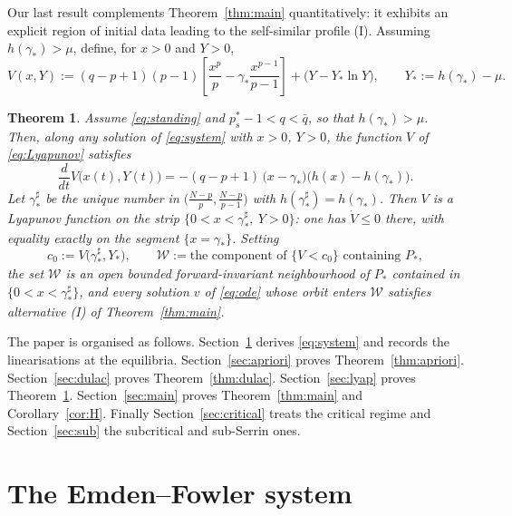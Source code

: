 \documentclass[11pt,reqno]{amsart}
\numberwithin{equation}{section}
\theoremstyle{plain}
\newtheorem{theorem}{Theorem}[section]
\theoremstyle{definition}
\newcommand{\gs}{\gamma_{*}}
\begin{document}
Our last result complements Theorem~\ref{thm:main} quantitatively: it exhibits
an explicit region of initial data leading to the self-similar profile
{\rm(I)}. Assuming $h(\gs)>\mu$, define, for $x>0$ and $Y>0$,
\begin{equation}\label{eq:Lyapunov}
V(x,Y):=(q-p+1)(p-1)\left[\frac{x^{p}}{p}-\gs\frac{x^{p-1}}{p-1}\right]
+\big(Y-Y_{*}\ln Y\big),
\qquad Y_{*}:=h(\gs)-\mu .
\end{equation}

\begin{theorem}\label{thm:lyap}
Assume \eqref{eq:standing} and $p^{*}_{s}-1<q<\bar q$, so that
$h(\gs)>\mu$. Then, along any solution of \eqref{eq:system} with $x>0$,
$Y>0$, the function $V$ of \eqref{eq:Lyapunov} satisfies
\begin{equation}\label{eq:Vdot}
\frac{d}{dt}V\big(x(t),Y(t)\big)
=-(q-p+1)\,\big(x-\gs\big)\big(h(x)-h(\gs)\big).
\end{equation}
Let $\gs^{\sharp}$ be the unique number in $\big(\frac{N-p}{p},
\frac{N-p}{p-1}\big)$ with $h(\gs^{\sharp})=h(\gs)$. Then $V$ is a Lyapunov
function on the strip $\{0<x<\gs^{\sharp},\ Y>0\}$: one has $\dot V\le0$
there, with equality exactly on the segment $\{x=\gs\}$. Setting
\begin{equation}\label{eq:basin}
c_{0}:=V\big(\gs^{\sharp},Y_{*}\big),
\qquad
\mathcal W:=\text{the component of }\big\{V<c_{0}\big\}\text{ containing }P_{*},
\end{equation}
the set $\mathcal W$ is an open bounded forward-invariant neighbourhood of
$P_{*}$ contained in $\{0<x<\gs^{\sharp}\}$, and every solution $v$ of
\eqref{eq:ode} whose orbit enters $\mathcal W$ satisfies alternative {\rm(I)}
of Theorem~\ref{thm:main}.
\end{theorem}

The paper is organised as follows. Section~\ref{sec:system} derives
\eqref{eq:system} and records the linearisations at the equilibria.
Section~\ref{sec:apriori} proves Theorem~\ref{thm:apriori}.
Section~\ref{sec:dulac} proves Theorem~\ref{thm:dulac}.
Section~\ref{sec:lyap} proves Theorem~\ref{thm:lyap}.
Section~\ref{sec:main} proves Theorem~\ref{thm:main} and
Corollary~\ref{cor:H}. Finally Section~\ref{sec:critical} treats the critical
regime and Section~\ref{sec:sub} the subcritical and sub-Serrin ones.

\section{The Emden--Fowler system}\label{sec:system}
\end{document}

